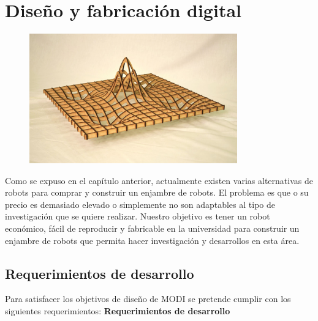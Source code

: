 \chapter{Diseño y fabricación digital} 

\label{Chapter4} 


\begin{figure}[htbp]
	\centering
		\includegraphics[width=0.8\textwidth]{./Figures/FabDig.JPG}
	\label{fig:FabDig}
\end{figure}

Como se expuso en el capítulo anterior, actualmente existen varias alternativas de robots para comprar y construir un enjambre de robots. El problema es que o su precio es demasiado elevado o simplemente no son adaptables al tipo de investigación que se quiere realizar. Nuestro objetivo es tener un robot económico, fácil de reproducir y fabricable en la universidad para construir un enjambre de robots que permita hacer investigación y desarrollos en esta área.


\section{Requerimientos de desarrollo}

Para satisfacer los objetivos de diseño de MODI se pretende cumplir con los siguientes requerimientos:
\newpage 
\textbf{Requerimientos de desarrollo}

